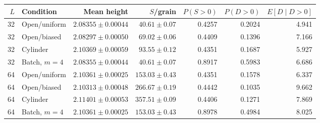 \begin{tabular}{@{}rlrrrrr@{}}
\toprule
$L$ & Condition & Mean height & $S$/grain & $P(S>0)$ & $P(D>0)$ & $E[D\mid D>0]$ \\
\midrule
32 & Open/uniform & $2.08355 \pm 0.00044$ & $40.61 \pm 0.07$ & 0.4257 & 0.2024 & 4.941 \\
32 & Open/biased & $2.08297 \pm 0.00050$ & $69.02 \pm 0.06$ & 0.4409 & 0.1396 & 7.166 \\
32 & Cylinder & $2.10369 \pm 0.00059$ & $93.55 \pm 0.12$ & 0.4351 & 0.1687 & 5.927 \\
32 & Batch, $m=4$ & $2.08355 \pm 0.00044$ & $40.61 \pm 0.07$ & 0.8917 & 0.5983 & 6.686 \\
64 & Open/uniform & $2.10361 \pm 0.00025$ & $153.03 \pm 0.43$ & 0.4351 & 0.1578 & 6.337 \\
64 & Open/biased & $2.10313 \pm 0.00048$ & $266.67 \pm 0.19$ & 0.4442 & 0.1035 & 9.662 \\
64 & Cylinder & $2.11401 \pm 0.00053$ & $357.51 \pm 0.09$ & 0.4406 & 0.1271 & 7.869 \\
64 & Batch, $m=4$ & $2.10361 \pm 0.00025$ & $153.03 \pm 0.43$ & 0.8978 & 0.4984 & 8.025 \\
\bottomrule
\end{tabular}
